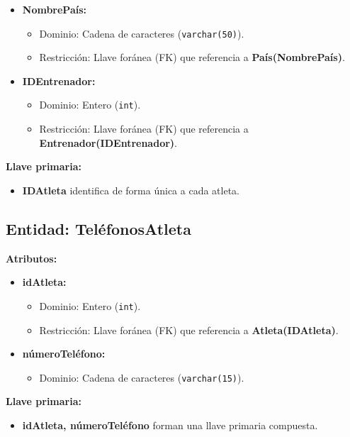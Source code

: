 \begin{itemize}
    \item \textbf{NombrePaís:}
    \begin{itemize}
        \item Dominio: Cadena de caracteres (\texttt{varchar(50)}).
        \item Restricción: Llave foránea (FK) que referencia a \textbf{País(NombrePaís)}.
    \end{itemize}
    \item \textbf{IDEntrenador:}
    \begin{itemize}
        \item Dominio: Entero (\texttt{int}).
        \item Restricción: Llave foránea (FK) que referencia a \textbf{Entrenador(IDEntrenador)}.
    \end{itemize}
\end{itemize}
\textbf{Llave primaria:}
\begin{itemize}
    \item \textbf{IDAtleta} identifica de forma única a cada atleta.
\end{itemize}

\subsection*{Entidad: TeléfonosAtleta}
\textbf{Atributos:}
\begin{itemize}
    \item \textbf{idAtleta:}
    \begin{itemize}
        \item Dominio: Entero (\texttt{int}).
        \item Restricción: Llave foránea (FK) que referencia a \textbf{Atleta(IDAtleta)}.
    \end{itemize}
    \item \textbf{númeroTeléfono:}
    \begin{itemize}
        \item Dominio: Cadena de caracteres (\texttt{varchar(15)}).
    \end{itemize}
\end{itemize}
\textbf{Llave primaria:}
\begin{itemize}
    \item \textbf{idAtleta, númeroTeléfono} forman una llave primaria compuesta.
\end{itemize}

